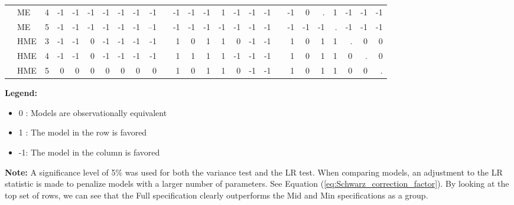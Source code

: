\documentclass[12pt]{article}
\theoremstyle{definition}
\begin{document}
\begin{landscape}
\begin{table}[t!]
\begin{threeparttable}
{\begin{tabular}[r]{l l l r r r r r r r r r r r r r r r r r r r r r r r}
         & ME  & 4       & -1  & -1  & -1  & -1  & -1   & -1   &  -1          && -1  &  -1 & -1  &  1  & -1   & -1   &  -1          && -1  &  0  &  .  &  1  & -1   & -1   & -1       \\
         & ME  & 5       & -1  & -1  & -1  & -1  & -1   & -1   & --1          && -1  &  -1 & -1  & -1  & -1   & -1   &  -1          && -1  & -1  & -1  &  .  & -1   & -1   & -1       \\
         & HME & 3       & -1  & -1  &  0  & -1  & -1   & -1   &  -1          &&  1  &   0 &  1  &  1  &  0   & -1   &  -1          &&  1  &  0  &  1  &  1  &  .   &  0   &  0       \\
         & HME & 4       & -1  & -1  &  0  & -1  & -1   & -1   &  -1          &&  1  &   1 &  1  &  1  & -1   & -1   &  -1          &&  1  &  0  &  1  &  1  &  0   &  .   &  0       \\
         & HME & 5       &  0  &  0  &  0  &  0  &  0   &  0   &   0          &&  1  &   0 &  1  &  1  &  0   & -1   &  -1          &&  1  &  0  &  1  &  1  &  0   &  0   &  .       \\
        \cmidrule(l){1-26}
    \end{tabular}
    }
    \begin{tablenotes}
      \item{\footnotesize \textbf{Legend:}
      \begin{itemize}
        \item 0 :  Models are observationally equivalent
        \item 1 :  The model in the row is favored
        \item -1: The model in the column is favored
      \end{itemize}
      }
      \item{\footnotesize \textbf{Note:}
      A significance level of 5\% was used for both the variance test and
      the LR test. When comparing models, an adjustment to the LR statistic
      is made to penalize models with a larger number of parameters. See
      Equation (\ref{eq:Schwarz_correction_factor}). By looking at the
      top set of rows, we can see that the Full specification
      clearly outperforms the Mid and Min specifications as a group.}
    \end{tablenotes} \label{tbl:voung_comparison}
  \end{threeparttable}
\end{table}
\end{landscape}
\end{document}
